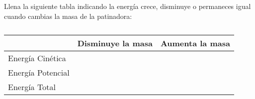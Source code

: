 Llena la siguiente tabla indicando la energía crece, disminuye o permaneces igual cuando cambias la masa de la patinadora:
\renewcommand{\arraystretch}{1.6}

\begin{table}[H]
    \centering
    \begin{tabular}{|l|c|c|}
        \hline
                          & Disminuye la masa & Aumenta la masa \\ \hline
        Energía Cinética  &                   &                 \\ \hline
        Energía Potencial &                   &                 \\ \hline
        Energía Total     &                   &                 \\ \hline
    \end{tabular}
    \caption{}
    \label{tab:masa}
\end{table}
